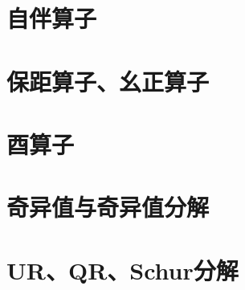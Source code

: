 \documentclass[12pt, a4paper, oneside, UTF8]{ctexbook}
\begin{document}
	\section{自伴算子}
	\section{保距算子、幺正算子}
	\section{酉算子}
	\section{奇异值与奇异值分解}
	\section{UR、QR、Schur分解}
\ifx\allfiles\undefined
\end{document}
